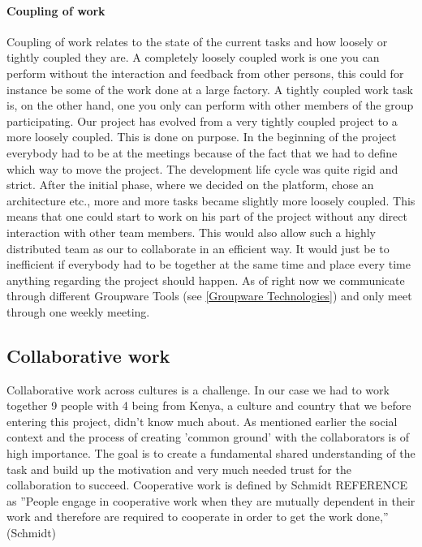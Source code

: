 \paragraph{Coupling of work} \label{par:couplingofwork}
Coupling of work relates to the state of the current tasks and how loosely or tightly coupled they are. A completely loosely coupled work is one you can perform without the interaction and feedback from other persons, this could for instance be some of the work done at a large factory. A tightly coupled work task is, on the other hand, one you only can perform with other members of the group participating. Our project has evolved from a very tightly coupled project to a more loosely coupled. This is done on purpose. In the beginning of the project everybody had to be at the meetings because of the fact that we had to define which way to move the project. The development life cycle was quite rigid and strict. After the initial phase, where we decided on the platform, chose an architecture etc., more and more tasks became slightly more loosely coupled. This means that one could start to work on his part of the project without any direct interaction with other team members. This would also allow such a highly distributed team as our to collaborate in an efficient way. It would just be to inefficient if everybody had to be together at the same time and place every time anything regarding the project should happen. As of right now we communicate through different Groupware Tools (see \ref{Groupware Technologies}) and only meet through one weekly meeting.

\subsection{Collaborative work} \label{sub:collaborativework}
Collaborative work across cultures is a challenge. In our case we had to work together 9 people with 4 being from Kenya, a culture and country that we before entering this project, didn't know much about. As mentioned earlier the social context and the process of creating 'common ground' with the collaborators is of high importance. The goal is to create a fundamental shared understanding of the task and build up the motivation and very much needed trust for the collaboration to succeed. Cooperative work is defined by Schmidt REFERENCE as ''People engage in cooperative work when they are mutually dependent in their work and therefore are required to cooperate in order to get the work done,'' (Schmidt)


